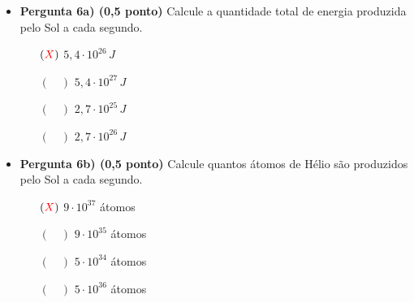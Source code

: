 \documentclass[a4paper, 12pt]{article}
\newcommand{\red}[1]{\textcolor{red}{#1}}
\begin{document}
\begin{flushleft}
\begin{itemize}
                \begin{itemize}
                    \item \textbf{Pergunta 6a) (0,5 ponto)} Calcule a quantidade total de energia produzida pelo Sol a cada segundo.
                        \begin{itemize}
                            \item[$(\red{X})$] $5,4 \cdot 10^{26} \, J$
                            \item[$(\quad)$] $5,4 \cdot 10^{27} \, J$
                            \item[$(\quad)$] $2,7 \cdot 10^{25} \, J$
                            \item[$(\quad)$] $2,7 \cdot 10^{26} \, J$
                        \end{itemize}
                    \item \textbf{Pergunta 6b) (0,5 ponto)} Calcule quantos átomos de Hélio são produzidos pelo Sol a cada segundo.
                        \begin{itemize}
                            \item[$(\red{X})$] $9 \cdot 10^{37}$ átomos
                            \item[$(\quad)$] $9 \cdot 10^{35}$ átomos
                            \item[$(\quad)$] $5 \cdot 10^{34}$ átomos
                            \item[$(\quad)$] $5 \cdot 10^{36}$ átomos
                        \end{itemize}
                \end{itemize}
            

\end{itemize}
\end{flushleft}
\end{document}
